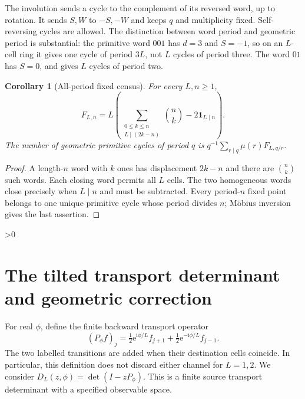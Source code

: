 \documentclass[10pt]{article}
\newtheorem{corollary}{Corollary}
\newcommand{\ii}{\mathrm i}
\newcommand{\ee}{\mathrm e}
\begin{document}
The involution sends a cycle to the complement of its reversed word, up to
rotation. It sends $S,W$ to $-S,-W$ and keeps $q$ and multiplicity fixed.
Self-reversing cycles are allowed. The distinction between word period and
geometric period is substantial: the primitive word $001$ has $d=3$ and
$S=-1$, so on an $L$-cell ring it gives one cycle of period $3L$, not $L$
cycles of period three. The word $01$ has $S=0$, and gives $L$ cycles of
period two.

\begin{corollary}[All-period fixed census]
For every $L,n\geq1$,
\begin{equation}\label{eq:census}
F_{L,n}=L\left(\sum_{\substack{0\leq k\leq n\\L\mid(2k-n)}}
\binom nk-2\mathbf1_{L\mid n}\right).
\end{equation}
The number of geometric primitive cycles of period $q$ is
$q^{-1}\sum_{r\mid q}\mu(r)F_{L,q/r}$.
\end{corollary}
\begin{proof}
A length-$n$ word with $k$ ones has displacement $2k-n$ and there are
$\binom nk$ such words. Each closing word permits all $L$ cells. The two
homogeneous words close precisely when $L\mid n$ and must be subtracted.
Every period-$n$ fixed point belongs to one unique primitive cycle whose
period divides $n$; Möbius inversion gives the last assertion.
\end{proof}

\ifnum\CRevisionRound>0
\section{The tilted transport determinant and geometric correction}
For real $\phi$, define the finite backward transport operator
\begin{equation}\label{eq:transport}
(P_\phi f)_j=\tfrac12\ee^{\ii\phi/L}f_{j+1}
             +\tfrac12\ee^{-\ii\phi/L}f_{j-1}.
\end{equation}
The two labelled transitions are added when their destination cells coincide.
In particular, this definition does not discard either channel for $L=1,2$.
We consider $D_L(z,\phi)=\det(I-zP_\phi)$. This is a finite source transport
determinant with a specified observable space.
\end{document}
